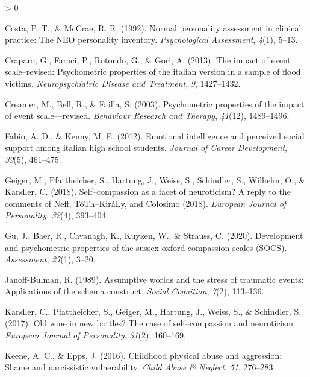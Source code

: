 \documentclass[
  english,
  man,floatsintext]{apa7}
\newlength{\cslhangindent}
\newenvironment{CSLReferences}[2] %
 {%
  \setlength{\parindent}{0pt}
  \ifodd #1 \everypar{\setlength{\hangindent}{\cslhangindent}}\ignorespaces\fi
  \ifnum #2 > 0
  \setlength{\parskip}{#2\baselineskip}
  \fi
 }%
 {}
\begin{document}
\begin{CSLReferences}{1}{0}
\leavevmode\hypertarget{ref-costa1992normal}{}%
Costa, P. T., \& McCrae, R. R. (1992). Normal personality assessment in clinical practice: The NEO personality inventory. \emph{Psychological Assessment}, \emph{4}(1), 5--13.

\leavevmode\hypertarget{ref-craparo2013impact}{}%
Craparo, G., Faraci, P., Rotondo, G., \& Gori, A. (2013). The impact of event scale--revised: Psychometric properties of the italian version in a sample of flood victims. \emph{Neuropsychiatric Disease and Treatment}, \emph{9}, 1427--1432.

\leavevmode\hypertarget{ref-creamer2003psychometric}{}%
Creamer, M., Bell, R., \& Failla, S. (2003). Psychometric properties of the impact of event scale---revised. \emph{Behaviour Research and Therapy}, \emph{41}(12), 1489--1496.

\leavevmode\hypertarget{ref-fabio2012emotional}{}%
Fabio, A. D., \& Kenny, M. E. (2012). Emotional intelligence and perceived social support among italian high school students. \emph{Journal of Career Development}, \emph{39}(5), 461--475.

\leavevmode\hypertarget{ref-geiger2018self}{}%
Geiger, M., Pfattheicher, S., Hartung, J., Weiss, S., Schindler, S., Wilhelm, O., \& Kandler, C. (2018). Self--compassion as a facet of neuroticism? A reply to the comments of {Neff, T{ó}Th--Kir{á}Ly, and Colosimo (2018)}. \emph{European Journal of Personality}, \emph{32}(4), 393--404.

\leavevmode\hypertarget{ref-gu2020development}{}%
Gu, J., Baer, R., Cavanagh, K., Kuyken, W., \& Strauss, C. (2020). Development and psychometric properties of the sussex-oxford compassion scales (SOCS). \emph{Assessment}, \emph{27}(1), 3--20.

\leavevmode\hypertarget{ref-janoff1989assumptive}{}%
Janoff-Bulman, R. (1989). Assumptive worlds and the stress of traumatic events: Applications of the schema construct. \emph{Social Cognition}, \emph{7}(2), 113--136.

\leavevmode\hypertarget{ref-kandler2017old}{}%
Kandler, C., Pfattheicher, S., Geiger, M., Hartung, J., Weiss, S., \& Schindler, S. (2017). Old wine in new bottles? The case of self--compassion and neuroticism. \emph{European Journal of Personality}, \emph{31}(2), 160--169.

\leavevmode\hypertarget{ref-keene2016childhood}{}%
Keene, A. C., \& Epps, J. (2016). Childhood physical abuse and aggression: Shame and narcissistic vulnerability. \emph{Child Abuse \& Neglect}, \emph{51}, 276--283.


\end{CSLReferences}
\end{document}
